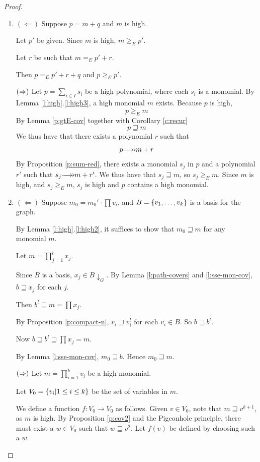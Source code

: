 \documentclass[numbers=enddot]{scrartcl}
\newcommand{\downg}[1]{{#1}{\downarrow_G}}
\newcommand{\gtE}{\geq_E}
\newcommand{\cov}{\sqsupseteq}
\newcommand{\LA}{\Leftarrow}
\begin{document}
\begin{proof}
  \begin{enumerate}

    \item
    $(\LA)$
    Suppose $p = m + q$ and $m$ is high.

    Let $p'$ be given. Since $m$ is high, $m \gtE p'$.

    Let $r$ be such that $m =_E p' + r$.

    Then $p =_E p' + r + q$ and $p \gtE p'$.
    
    $(\Rightarrow)$
    Let $p = \sum_{i \in I} s_i$ be a high polynomial, where each $s_i$ is a monomial.  By Lemma \ref{l:high}.\ref{l:high3}, a high monomial $m$ exists.  Because $p$ is high,
    \[ p \gtE m \]
    By Lemma \ref{p:gtE-cov} together with Corollary \ref{c:recur}
    \[ p \cov m \]
    We thus have that there exists a polynomial $r$ such that
    \[ p \thra m + r\]
    By Proposition \ref{p:sum-red}, there exists a monomial $s_j$ in $p$ and a polynomial $r'$ such that $s_j \thra m + r'$.  We thus have that $s_j \cov m$, so $s_j \gtE m$.
    Since $m$ is high, and $s_j \gtE m$, $s_j$ is high and $p$ contains a high monomial.

    \item 
    $(\LA)$
    Suppose $m_0 = m_0' \cdot \prod {v_i}$, and $B = \left\{v_1,\dots,v_k\right\}$ is a basis for the graph.

    By Lemma \ref{l:high}.\ref{l:high2}, it suffices to show that $m_0 \cov m$ for any monomial $m$.

    Let $m = \prod_{j = 1}^l x_j$.

    Since $B$ is a basis, $x_j \in \downg{B}$.  By Lemma \ref{l:path-covers} and \ref{l:sse-mon-cov}, 
        $b \cov x_j$ for each $j$.

    Then $b^l \cov m = \prod x_j$.

    By Proposition \ref{p:compact-n}, $v_i \cov v_i^l$ for each $v_i \in B$.  So $b \cov b^l$.

    Now $b \cov b^l \cov \prod x_j = m$. 
    
    By Lemma \ref{l:sse-mon-cov}, $m_0 \cov b$. Hence $m_0 \cov m$.

    $(\Rightarrow)$ 
    Let $m = \prod_{i = 1}^k v_i$ be a high monomial.

    Let $V_0 = \left\{v_i | 1 \le i \le k\right\}$ be the set of variables in $m$.

    We define a function $f : V_0 \to V_0$ as follows. 
    Given $v \in V_0$, note that $m \cov v^{k+1}$, as $m$ is high.
    By Proposition \ref{p:cov2} and the Pigeonhole principle, there must exist a $w \in V_0$ such that $w \cov v^{2}$.
    Let $f(v)$ be defined by choosing such a $w$.


\end{enumerate}
\end{proof}
\end{document}
